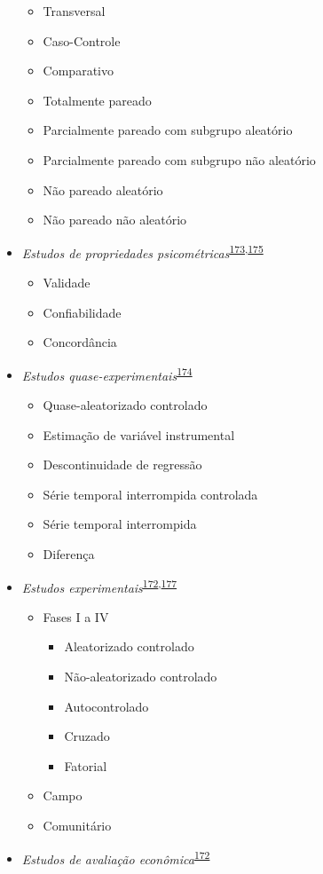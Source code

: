 \documentclass[
  a4paper,
]{book}
\begin{document}
\begin{itemize}
  \begin{itemize}
  \item
    Transversal
  \item
    Caso-Controle
  \item
    Comparativo
  \item
    Totalmente pareado
  \item
    Parcialmente pareado com subgrupo aleatório
  \item
    Parcialmente pareado com subgrupo não aleatório
  \item
    Não pareado aleatório
  \item
    Não pareado não aleatório
  \end{itemize}
\item
  \emph{Estudos de propriedades psicométricas}\textsuperscript{\protect\hyperlink{ref-Souza2017}{173},\protect\hyperlink{ref-echevarruxeda-guanilo2019}{175}}

  \begin{itemize}
  \item
    Validade
  \item
    Confiabilidade
  \item
    Concordância
  \end{itemize}
\item
  \emph{Estudos quase-experimentais}\textsuperscript{\protect\hyperlink{ref-reeves2017}{174}}

  \begin{itemize}
  \item
    Quase-aleatorizado controlado
  \item
    Estimação de variável instrumental
  \item
    Descontinuidade de regressão
  \item
    Série temporal interrompida controlada
  \item
    Série temporal interrompida
  \item
    Diferença
  \end{itemize}
\item
  \emph{Estudos experimentais}\textsuperscript{\protect\hyperlink{ref-Suxfct2014}{172},\protect\hyperlink{ref-Chidambaram2019}{177}}

  \begin{itemize}
  \item
    Fases I a IV

    \begin{itemize}
    \item
      Aleatorizado controlado
    \item
      Não-aleatorizado controlado
    \item
      Autocontrolado
    \item
      Cruzado
    \item
      Fatorial
    \end{itemize}
  \item
    Campo
  \item
    Comunitário
  \end{itemize}
\item
  \emph{Estudos de avaliação econômica}\textsuperscript{\protect\hyperlink{ref-Suxfct2014}{172}}


\end{itemize}
\end{document}
